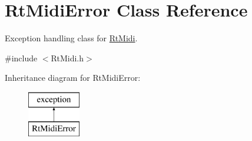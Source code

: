 \hypertarget{class_rt_midi_error}{}\section{Rt\+Midi\+Error Class Reference}
\label{class_rt_midi_error}


Exception handling class for \hyperlink{class_rt_midi}{Rt\+Midi}.  




{\ttfamily \#include $<$Rt\+Midi.\+h$>$}

Inheritance diagram for Rt\+Midi\+Error\+:\begin{figure}[H]
\begin{center}
\leavevmode
\includegraphics[height=2.000000cm]{class_rt_midi_error}
\end{center}
\end{figure}
